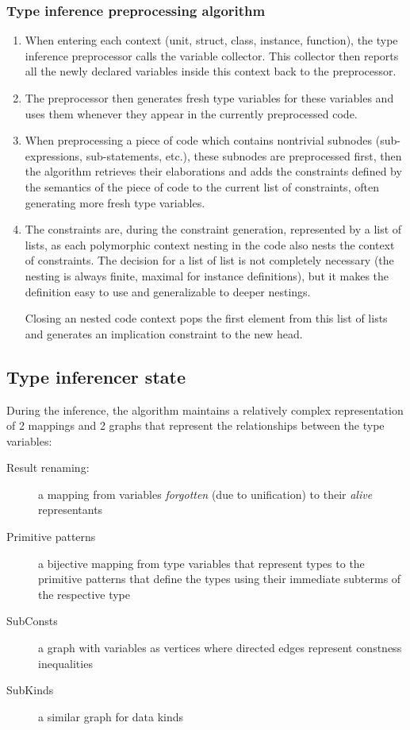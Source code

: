 \subsubsection{Type inference preprocessing algorithm}

\begin{enumerate}
    \item When entering each context (unit, struct, class, instance, function), the type inference preprocessor calls the variable collector. This collector then reports all the newly declared variables inside this context back to the preprocessor.

    \item The preprocessor then generates fresh type variables for these variables and uses them whenever they appear in the currently preprocessed code.

    \item When preprocessing a piece of code which contains nontrivial subnodes (sub-expressions, sub-statements, etc.), these subnodes are preprocessed first, then the algorithm retrieves their elaborations and adds the constraints defined by the semantics of the piece of code to the current list of constraints, often generating more fresh type variables.

    \item The constraints are, during the constraint generation, represented by a list of lists, as each polymorphic context nesting in the code also nests the context of constraints. The decision for a list of list is not completely necessary (the nesting is always finite, maximal for instance definitions), but it makes the definition easy to use and generalizable to deeper nestings.

    Closing an nested code context pops the first element from this list of lists and generates an implication constraint to the new head.
\end{enumerate}

\subsection{Type inferencer state}
\label{sec:istate}

During the inference, the algorithm maintains a relatively complex representation of 2 mappings and 2 graphs that represent the relationships between the type variables:

\begin{description}
    \item[Result renaming:]a mapping from variables \emph{forgotten} (due to unification) to their \emph{alive} representants
    \item[Primitive patterns] a bijective mapping from type variables that represent types to the primitive patterns that define the types using their immediate subterms of the respective type
    \item[SubConsts] a graph with variables as vertices where directed edges represent constness inequalities
    \item[SubKinds] a similar graph for data kinds
\end{description}

